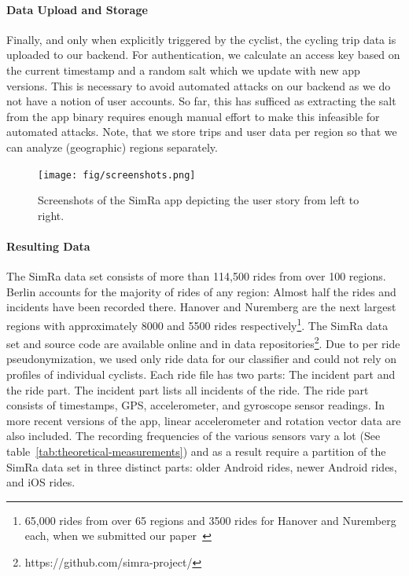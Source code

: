 \paragraph{Data Upload and Storage}
Finally, and only when explicitly triggered by the cyclist, the cycling trip data is uploaded to our backend.
For authentication, we calculate an access key based on the current timestamp and a random salt which we update with new app versions.
This is necessary to avoid automated attacks on our backend as we do not have a notion of user accounts.
So far, this has sufficed as extracting the salt from the app binary requires enough manual effort to make this infeasible for automated attacks.
Note, that we store trips and user data per region so that we can analyze (geographic) regions separately.

\begin{figure}[ht]
	\centering
	\texttt{[image: fig/screenshots.png]}
	\caption{Screenshots of the SimRa app depicting the user story from left to right.}
	\label{fig:user-story}
\end{figure}


\paragraph{Resulting Data}
The SimRa data set consists of more than 114,500 rides from over 100 regions.
Berlin accounts for the majority of rides of any region: Almost half the rides and incidents have been recorded there.
Hanover and Nuremberg are the next largest regions with approximately 8000 and 5500 rides respectively\footnote{65,000 rides from over 65 regions and 3500 rides for Hanover and Nuremberg each, when we submitted our paper~\cite{karakaya2022cyclesense}}.
The SimRa data set and source code are available online and in data repositories\footnote{https://github.com/simra-project/}.
Due to per ride pseudonymization, we used only ride data for our classifier and could not rely on profiles of individual cyclists.
Each ride file has two parts: The incident part and the ride part.
The incident part lists all incidents of the ride.
The ride part consists of timestamps, GPS, accelerometer, and gyroscope sensor readings. In more recent versions of the app, linear accelerometer and rotation vector data are also included.
The recording frequencies of the various sensors vary a lot (See table~\ref{tab:theoretical-measurements}) and as a result require a partition of the SimRa data set in three distinct parts: older Android rides, newer Android rides, and iOS rides.



